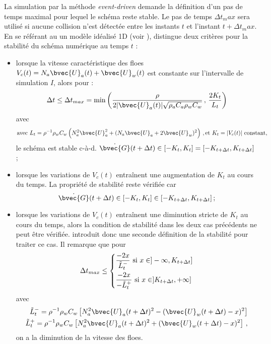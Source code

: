 La simulation par la méthode \textit{event-driven} demande la définition d'un pas de temps maximal pour lequel le schéma reste stable. Le pas de temps $\Delta t_max$ sera utilisé si aucune collision n'est détectée entre les instants $t$ et l'instant $t + \Delta t_max$. En se référant au un modèle idéalisé 1D (voir \parencite[p.49]{rabatel2015thesis}), \citeauthor{rabatel2015thesis} distingue deux critères pour la stabilité du schéma numérique au temps $t$ :
\begin{itemize}
    \item lorsque la vitesse caractéristique des floes $V_c(t) = N_a \bvec{U}_a(t) + \bvec{U}_w(t)$ est constante sur l'intervalle de simulation $I$, alors pour :  
    \begin{align} \label{eq:dtmax1}
        \Delta t \leq \Delta t_{max} = \min{ \left(\frac{\rho}{2 \vert \bvec{U}_a(t) \vert \sqrt{\rho_a C_a \rho_w C_w}} \,, \,\frac{2K_t}{L_t} \right)}
    \end{align}
    avec 
    $$
    \text{avec } L_t = \rho^{-1} \rho_w C_w \left( N_a^2 \bvec{U}_a^2 + (N_a\bvec{U}_a + 2 \bvec{U}_w)^2 \right) \,, \text{et } K_t = \vert V_c(t) \vert \text{ constant, }
    $$
    le schéma est stable c-à-d. $\dot{\bvec{G}} (t + \Delta t) \in [-K_t, K_t] = [-K_{t + \Delta t}, K_{t + \Delta t}]$ ;
    \item lorsque les variations de $V_c(t)$ entraînent une augmentation de $K_t$ au cours du temps. La propriété de stabilité reste vérifiée car $$\dot{\bvec{G}} (t + \Delta t) \in [-K_t, K_t] \in [-K_{t + \Delta t}, K_{t + \Delta t}] \,;$$
    \item lorsque les variations de $V_c(t)$ entraînent une diminution stricte de $K_t$ au cours du temps, alors la condition de stabilité dans les deux cas précédents ne peut être vérifiée. \citeauthor{rabatel2015thesis} introduit donc une seconde définition de la stabilité pour traiter ce cas. Il remarque que pour 
    \begin{align} \label{eq:dtmax2}
    \Delta t_{max} \leq \begin{dcases}
        \frac{-2x}{\tilde{L}_t^{-}} \text{  si  } x \in  ]-\infty, K_{t+\Delta t}] \\
        \frac{-2x}{-\tilde{L}_t^{+}} \text{  si  } x \in  ]K_{t+\Delta t}, +\infty]
    \end{dcases}\end{align}
    avec \begin{align*} \tilde{L}_t^{-} =  \rho^{-1} \rho_w C_w \left[ N_a^2 \bvec{U}_a(t+\Delta t)^2 - (\bvec{U}_w(t + \Delta t) - x)^2 \right] \\ \tilde{L}_t^{+} =  \rho^{-1} \rho_w C_w \left[ N_a^2 \bvec{U}_a(t+\Delta t)^2 + (\bvec{U}_w(t + \Delta t) - x)^2 \right] \,,
     \end{align*}
    on a la diminution de la vitesse des floes.
\end{itemize} 
